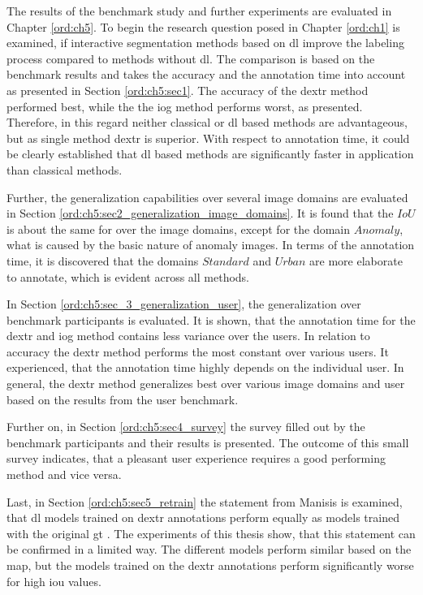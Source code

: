 The results of the benchmark study and further experiments are evaluated in Chapter \ref{ord:ch5}.
To begin the research question posed in Chapter \ref{ord:ch1} is examined, if interactive segmentation methods based on \gls{dl} improve the labeling process compared to methods without \gls{dl}.
The comparison is based on the benchmark results and takes the accuracy and the annotation time into account as presented in Section \ref{ord:ch5:sec1}.
The accuracy of the \gls{dextr} method performed best, while the the \gls{iog} method performs worst, as presented.
Therefore, in this regard neither classical or \gls{dl} based methods are advantageous, but as single method \gls{dextr} is superior.
With respect to annotation time, it could be clearly established that \gls{dl} based methods are significantly faster in application than classical methods.

Further, the generalization capabilities over several image domains are evaluated in Section \ref{ord:ch5:sec2_generalization_image_domains}.
It is found that the $ IoU $ is about the same for over the image domains, except for the domain $ Anomaly $, what is caused by the basic nature of anomaly images.
In terms of the annotation time, it is discovered that the domains $ Standard $ and $ Urban $ are more elaborate to annotate, which is evident across all methods.

In Section \ref{ord:ch5:sec_3_generalization_user}, the generalization over benchmark participants is evaluated.
It is shown, that the annotation time for the \gls{dextr} and \gls{iog} method contains less variance over the users.
In relation to accuracy the \gls{dextr} method performs the most constant over various users.
It experienced, that the annotation time highly depends on the individual user.
In general, the \gls{dextr} method generalizes best over various image domains and user based on the results from the user benchmark.

Further on, in Section \ref{ord:ch5:sec4_survey} the survey filled out by the benchmark participants and their results is presented.
The outcome of this small survey indicates, that a pleasant user experience requires a good performing method and vice versa.

Last, in Section \ref{ord:ch5:sec5_retrain} the statement from Manisis \etal is examined, that \gls{dl} models trained on \gls{dextr} annotations perform equally as models trained with the original \gls{gt} \cite{Man18-DEXTR}.
The experiments of this thesis show, that this statement can be confirmed in a limited way.
The different models perform similar based on the \gls{map}, but the models trained on the \gls{dextr} annotations perform significantly worse for high \gls{iou} values. 



